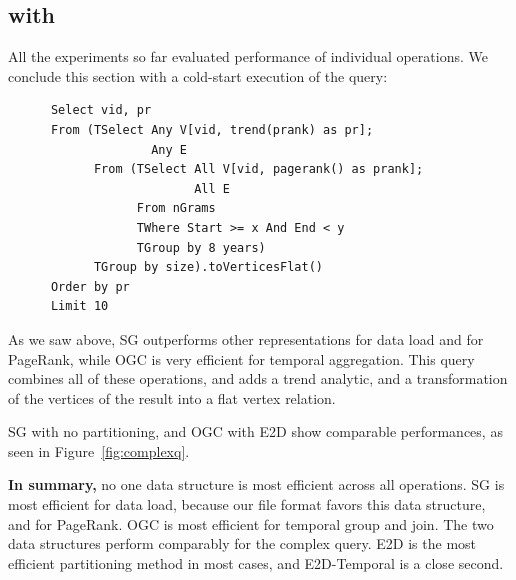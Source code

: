 \subsection{ with }

All the experiments so far evaluated performance of individual \ql
operations. We conclude this section with a cold-start execution of
the query:

\begin{small}
\begin{verbatim}
      Select vid, pr
      From (TSelect Any V[vid, trend(prank) as pr];
                    Any E
            From (TSelect All V[vid, pagerank() as prank]; 
                          All E
                  From nGrams
                  TWhere Start >= x And End < y
                  TGroup by 8 years)
            TGroup by size).toVerticesFlat()
      Order by pr
      Limit 10
\end{verbatim}
\end{small}

As we saw above, SG outperforms other representations for data load
and for PageRank, while OGC is very efficient for temporal
aggregation.  This query combines all of these operations, and adds a
trend analytic, and a transformation of the vertices of the result
into a flat vertex relation.

SG with no partitioning, and OGC with E2D show comparable
performances, as seen in Figure~\ref{fig:complexq}.

{\bf In summary,} no one data structure is most efficient across all
operations.  SG is most efficient for data load, because our file
format favors this data structure, and for PageRank.  OGC is most
efficient for temporal group and join.  The two data structures
perform comparably for the complex query.  E2D is the most efficient
partitioning method in most cases, and E2D-Temporal is a close second.
